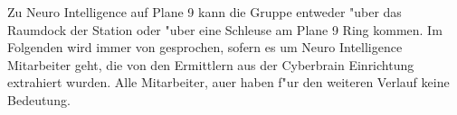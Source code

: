 
Zu Neuro Intelligence auf Plane 9 kann die Gruppe entweder "uber das Raumdock der Station oder "uber eine Schleuse am Plane 9 Ring kommen. Im Folgenden wird immer von \ml{} gesprochen, sofern es um Neuro Intelligence Mitarbeiter geht, die von den Ermittlern aus der Cyberbrain Einrichtung extrahiert wurden. Alle Mitarbeiter, au\3er \ml{} haben f"ur den weiteren Verlauf keine Bedeutung.
